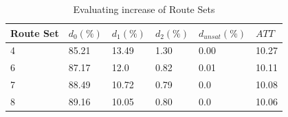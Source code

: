  \begin{table}[H]
    \centering
    \begin{tabular}{|l||l|l|l|l|l|}
    \hline
    Route Set & $d_0(\%)$ & $d_1(\%)$ & $d_2(\%)$ & $d_{unsat}(\%)$ & $ATT$ \\
    \hline
    4 & 85.21 & 13.49 & 1.30 & 0.00 & 10.27\\
    6 & 87.17 & 12.0 & 0.82 & 0.01 & 10.11\\
    7 & 88.49 & 10.72 & 0.79 & 0.0 & 10.08\\
    8 & 89.16 & 10.05 & 0.80 & 0.0 & 10.06\\
    \hline
    \end{tabular}
    \caption {Evaluating increase of Route Sets}
    \label{table:performanceComparison_routesets}
\end{table}







